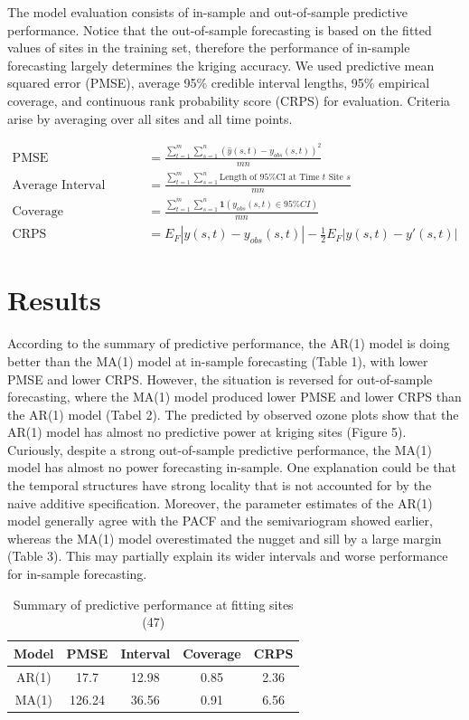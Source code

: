 \documentclass[12pt]{article}
\begin{document}
The model evaluation consists of in-sample and out-of-sample predictive performance. Notice that the out-of-sample forecasting is based on the fitted values of sites in the training set, therefore the performance of in-sample forecasting largely determines the kriging accuracy. We used predictive mean squared error (PMSE), average 95\% credible interval lengths, 95\% empirical coverage, and continuous rank probability score (CRPS) for evaluation. Criteria arise by averaging over all sites and all time points.

\begin{align*}
\text{PMSE} &= \frac{\sum_{t = 1}^m\sum_{s = 1}^{n}(\hat{y}(s, t) - y_{obs}(s, t))^2}{mn} \\
\text{Average Interval Length} &= \frac{\sum_{t = 1}^{m}\sum_{s = 1}^{n}\text{Length of 95\% CI at Time $t$ Site $s$}}{mn} \\
\text{Coverage} &= \frac{\sum_{t = 1}^{m}\sum_{s = 1}^{n}\mathbf{1}(y_{obs}(s, t) \in 95\% CI)}{mn} \\
\text{CRPS} &= E_{F}|y(s, t) - y_{obs}(s, t)| - \frac{1}{2}E_{F}|y(s, t) - y'(s, t)|
\end{align*}


\section{Results}
According to the summary of predictive performance, the AR(1) model is doing better than the MA(1) model at in-sample forecasting (Table 1), with lower PMSE and lower CRPS. However, the situation is reversed for out-of-sample forecasting, where the MA(1) model produced lower PMSE and lower CRPS than the AR(1) model (Tabel 2). The predicted by observed ozone plots show that the AR(1) model has almost no predictive power at kriging sites (Figure 5). Curiously, despite a strong out-of-sample predictive performance, the MA(1) model has almost no power forecasting in-sample. One explanation could be that the temporal structures have strong locality that is not accounted for by the naive additive specification. Moreover, the parameter estimates of the AR(1) model generally agree with the PACF and the semivariogram showed earlier, whereas the MA(1) model overestimated the nugget and sill by a large margin (Table 3). This may partially explain its wider intervals and worse performance for in-sample forecasting. 

\begin{table}[H]
\centering
\begin{tabular}{|c c c c c|}
\hline
Model & PMSE & Interval & Coverage & CRPS \\\hline 
AR(1) & 17.7 & 12.98 & 0.85 & 2.36\\
MA(1) & 126.24 & 36.56 & 0.91 & 6.56 \\\hline
\end{tabular}
\caption{Summary of predictive performance at fitting sites (47)}
\end{table}
\end{document}
